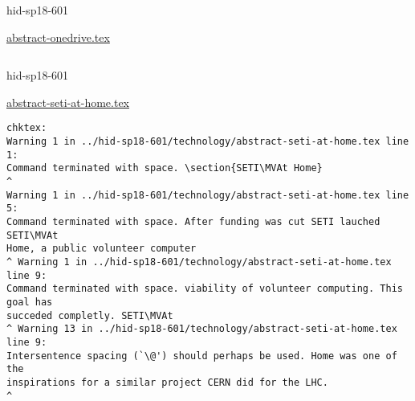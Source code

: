 \begin{IU}

hid-sp18-601

\href{https://github.com/cloudmesh-community/hid-sp18-601/blob/master//technology/abstract-onedrive.tex}{abstract-onedrive.tex}

\begin{tiny}
\begin{verbatim}
\end{verbatim}
\end{tiny}
\end{IU}



\begin{IU}

hid-sp18-601

\href{https://github.com/cloudmesh-community/hid-sp18-601/blob/master//technology/abstract-seti-at-home.tex}{abstract-seti-at-home.tex}

\begin{tiny}
\begin{verbatim}
chktex:
Warning 1 in ../hid-sp18-601/technology/abstract-seti-at-home.tex line 1:
Command terminated with space. \section{SETI\MVAt Home}                      ^
Warning 1 in ../hid-sp18-601/technology/abstract-seti-at-home.tex line 5:
Command terminated with space. After funding was cut SETI lauched SETI\MVAt
Home, a public volunteer computer
^ Warning 1 in ../hid-sp18-601/technology/abstract-seti-at-home.tex line 9:
Command terminated with space. viability of volunteer computing. This goal has
succeded completly. SETI\MVAt
^ Warning 13 in ../hid-sp18-601/technology/abstract-seti-at-home.tex line 9:
Intersentence spacing (`\@') should perhaps be used. Home was one of the
inspirations for a similar project CERN did for the LHC.
^
\end{verbatim}
\end{tiny}
\end{IU}



